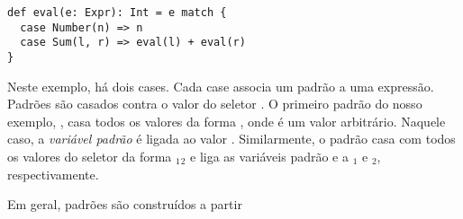 \begin{lstlisting}
def eval(e: Expr): Int = e match {
  case Number(n) => n 
  case Sum(l, r) => eval(l) + eval(r) 
}
\end{lstlisting}

Neste exemplo, h\'{a} dois cases. Cada case associa um padr\~{a}o a uma express\~{a}o. 
Padr\~{o}es s\~{a}o casados contra o valor do seletor . O primeiro padr\~{a}o do
nosso exemplo, , casa todos os valores da forma ,
onde  \'{e} um valor arbitr\'{a}rio. Naquele caso, a {\em vari\'{a}vel padr\~{a}o} 
\'{e} ligada ao valor . Similarmente, o padr\~{a}o  casa com todos 
os valores do seletor da forma $_1$$_2$\code{)} e liga as 
vari\'{a}veis padr\~{a}o  e  a $_1$ e $_2$, respectivamente. 


Em geral, padr\~{o}es s\~{a}o constru\'{i}dos a partir


